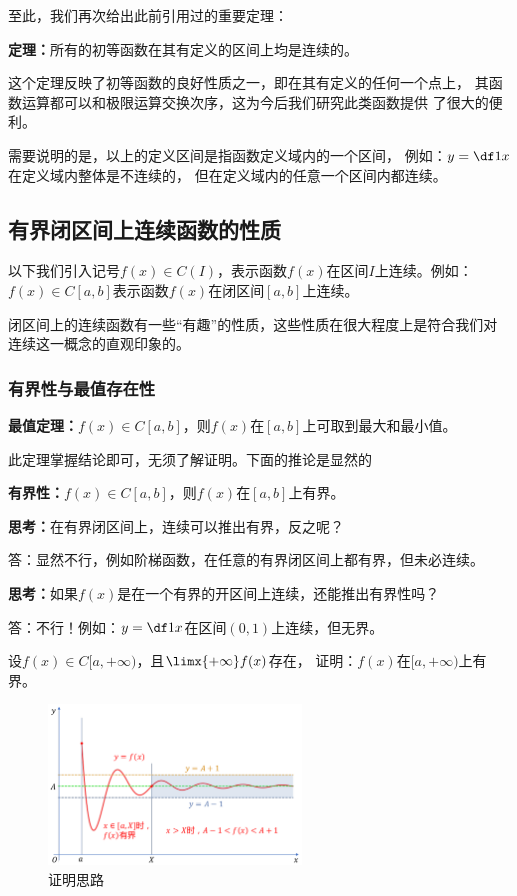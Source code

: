 至此，我们再次给出此前引用过的重要定理：
\begin{thx}
	{\bf 定理：}所有的初等函数在其有定义的区间上均是连续的。
\end{thx}
这个定理反映了初等函数的良好性质之一，即在其有定义的任何一个点上，
其函数运算都可以和极限运算交换次序，这为今后我们研究此类函数提供
了很大的便利。

需要说明的是，以上的定义区间是指函数定义域内的一个区间，
例如：$y=\df1x$在定义域内整体是不连续的，
但在定义域内的任意一个区间内都连续。

\subsection{有界闭区间上连续函数的性质}

以下我们引入记号$f(x)\in C(I)$，表示函数$f(x)$在区间$I$上连续。例如：
$f(x)\in C[a,b]$表示函数$f(x)$在闭区间$[a,b]$上连续。

闭区间上的连续函数有一些“有趣”的性质，这些性质在很大程度上是符合我们对
连续这一概念的直观印象的。

\subsubsection{有界性与最值存在性}

\begin{thx}
	{\bf 最值定理：}$f(x)\in C[a,b]$，则$f(x)$在$[a,b]$上可取到最大和最小值。
\end{thx}

此定理掌握结论即可，无须了解证明。下面的推论是显然的

\begin{thx}
	{\bf 有界性：}$f(x)\in C[a,b]$，则$f(x)$在$[a,b]$上有界。
\end{thx}

\bs
{\bf 思考：}在有界闭区间上，连续可以推出有界，反之呢？

\ifhint
答：显然不行，例如阶梯函数，在任意的有界闭区间上都有界，但未必连续。
\fi

\bs
{\bf 思考：}如果$f(x)$是在一个有界的开区间上连续，还能推出有界性吗？

\ifhint
答：不行！例如：$y=\df1x$在区间$(0,1)$上连续，但无界。 
\fi

\bs
\egz 设$f(x)\in C[a,+\infty)$，且$\limx{+\infty}f(x)$存在，
证明：$f(x)$在$[a,+\infty)$上有界。

\begin{figure}[h]
	\centering
	\includegraphics[width=0.6\textwidth]{./Images/Ch01/finfconvb.pdf}
	\caption{\exNo 证明思路}
	\label{fig:finfconvb}
\end{figure}

